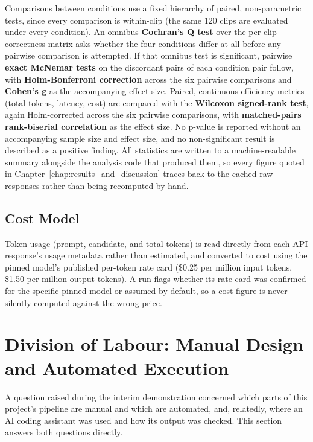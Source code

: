 Comparisons between conditions use a fixed hierarchy of paired, non-parametric tests, since every comparison is within-clip (the same 120 clips are evaluated under every condition). An omnibus \textbf{Cochran's Q test} over the per-clip correctness matrix asks whether the four conditions differ at all before any pairwise comparison is attempted. If that omnibus test is significant, pairwise \textbf{exact McNemar tests} on the discordant pairs of each condition pair follow, with \textbf{Holm-Bonferroni correction} across the six pairwise comparisons and \textbf{Cohen's g} as the accompanying effect size. Paired, continuous efficiency metrics (total tokens, latency, cost) are compared with the \textbf{Wilcoxon signed-rank test}, again Holm-corrected across the six pairwise comparisons, with \textbf{matched-pairs rank-biserial correlation} as the effect size. No p-value is reported without an accompanying sample size and effect size, and no non-significant result is described as a positive finding. All statistics are written to a machine-readable summary alongside the analysis code that produced them, so every figure quoted in Chapter~\ref{chap:results_and_discussion} traces back to the cached raw responses rather than being recomputed by hand.

\subsection{Cost Model}
Token usage (prompt, candidate, and total tokens) is read directly from each API response's usage metadata rather than estimated, and converted to cost using the pinned model's published per-token rate card (\$0.25 per million input tokens, \$1.50 per million output tokens). A run flags whether its rate card was confirmed for the specific pinned model or assumed by default, so a cost figure is never silently computed against the wrong price.

\section{Division of Labour: Manual Design and Automated Execution}
\label{sec:division_of_labour}
A question raised during the interim demonstration concerned which parts of this project's pipeline are manual and which are automated, and, relatedly, where an AI coding assistant was used and how its output was checked. This section answers both questions directly.

